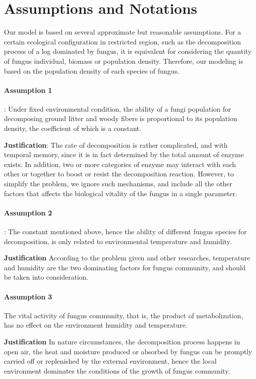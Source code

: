 \section{Assumptions and Notations}\label{sec:assump}

Our model is based on several approximate but reasonable assumptions. For a certain ecological configuration in restricted region, such as the decomposition process of a log dominated by fungus, it is equivalent for considering the quantity of fungus individual, biomass or population density. Therefore, our modeling is based on the population density of each species of fungus.

\paragraph{Assumption 1}: Under fixed environmental condition, the ability of a fungi population for decomposing ground litter and woody fibers is proportional to its population density, the coefficient of which is a constant.

\textbf{Justification}: The rate of decomposition is rather complicated, and with temporal memory, since it is in fact determined by the total amount of enzyme exists. In addition, two or more categories of enzyme may interact with each other or together to boost or resist the decomposition reaction. However, to simplify the problem, we ignore such mechanisms, and include all the other factors that affects the biological vitality of the fungus in a single parameter.

\paragraph{Assumption 2}: The constant mentioned above, hence the ability of different fungus species for decomposition, is only related to environmental temperature and humidity.

\textbf{Justification} According to the problem given and other researches, temperature and humidity are the two dominating factors for fungus community, and should be taken into consideration.

\paragraph{Assumption 3} The vital activity of fungus community, that is, the product of metabolization, has no effect on the environment humidity and temperature.

\textbf{Justification} In nature circumstances, the decomposition process happens in open air, the heat and moisture produced or absorbed by fungus can be promptly carried off or replenished  by the external environment, hence the local environment dominates the conditions of the growth of fungus community.

